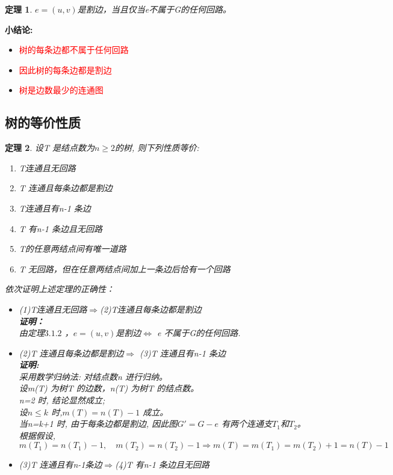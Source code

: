 \documentclass[11pt,a4paper,openany]{book}
\newcommand{\hwxw}{\CJKfamily{hwxw}}
\newcommand{\song}{\CJKfamily{song}}
\newtheorem{theorem}{\textbf{定理}}[section]
\begin{document}
\begin{theorem}
$e=(u,v)$是割边，当且仅当e不属于G的任何回路。\\
\end{theorem}
\textbf{小结论:}
\begin{itemize}
  \item \textcolor{red}{树的每条边都不属于任何回路}
  \item \textcolor{red}{因此树的每条边都是割边}
  \item \textcolor{red}{树是边数最少的连通图}
\end{itemize}
\subsection{树的等价性质}
\begin{theorem}
设T 是结点数为$n\geq2 $的树, 则下列性质等价:
\begin{enumerate}
  \item T连通且无回路
  \item T 连通且每条边都是割边
  \item T连通且有n-1 条边
  \item T 有n-1 条边且无回路
  \item T的任意两结点间有唯一道路
  \item T 无回路，但在任意两结点间加上一条边后恰有一个回路
\end{enumerate}
{\hwxw 依次证明上述定理的正确性：}
{\song
\begin{itemize}
  \item (1)T连通且无回路$\Rightarrow$(2)T连通且每条边都是割边\\
  \textbf{证明：}\\
  由定理$3.1.2$ ，$e=(u,v)$是割边$\Leftrightarrow$ e 不属于G的任何回路.
  \item (2)T 连通且每条边都是割边$\Rightarrow$ (3)T 连通且有n-1 条边\\
  \textbf{证明:}\\
  采用数学归纳法: 对结点数n 进行归纳。\\
  设m(T) 为树T 的边数，n(T) 为树T 的结点数。\\
  n=2 时, 结论显然成立;\\
  设$n\leq k$ 时,$m(T)=n(T)-1$ 成立。\\
  当n=k+1 时, 由于每条边都是割边, 因此图$G'=G - e$ 有两个连通支$T_1$和$T_2$。\\
  根据假设,$$ m(T_1)=n(T_1)-1,\quad m(T_2)=n(T_2)-1 \Rightarrow m(T)=m(T_1)=m(T_2)+1=n(T)-1$$
  \item (3)T 连通且有n-1条边$\Rightarrow$(4)T 有n-1 条边且无回路 \\

\end{itemize}}
\end{theorem}
\end{document}
